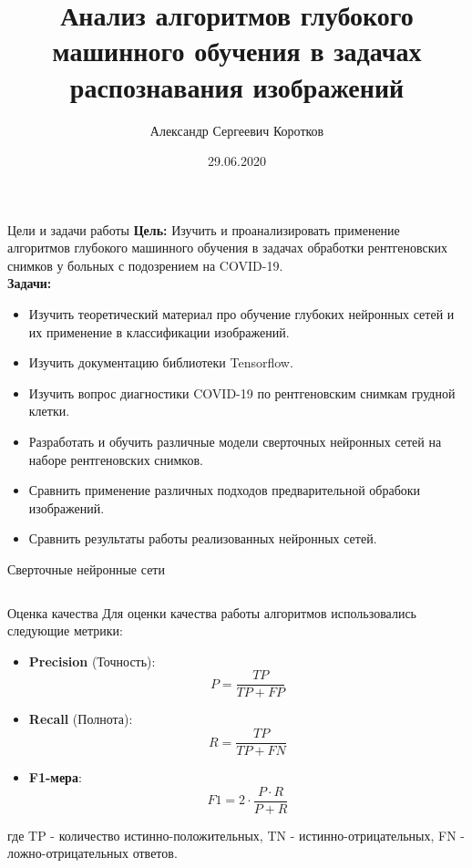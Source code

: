 \documentclass[aspectratio=169]{beamer}
\title{Анализ алгоритмов глубокого машинного обучения  в задачах распознавания изображений}
\author[Коротков А.С.]{Александр Сергеевич Коротков}
\institute[]{Научный руководитель: Д.В. Матвеев}
\date{29.06.2020}
\begin{document}
\maketitle
\begin{frame}{Цели и задачи работы}
    \textbf{Цель:} Изучить и проанализировать применение алгоритмов глубокого машинного обучения  в задачах обработки рентгеновских снимков у больных с подозрением на COVID-19. \\
    \textbf{Задачи: }
    \begin{itemize}
        \item Изучить теоретический материал про обучение глубоких нейронных сетей и их применение в классификации изображений.
        \item Изучить документацию библиотеки Tensorflow.
        \item Изучить вопрос диагностики COVID-19 по рентгеновским снимкам грудной клетки.
        \item Разработать и обучить различные модели сверточных нейронных сетей на наборе рентгеновских снимков.
        \item Сравнить применение различных подходов предварительной обрабоки изображений.
        \item Сравнить результаты работы реализованных нейронных сетей.
    \end{itemize}
\end{frame}

\begin{frame}{Сверточные нейронные сети}
    \begin{columns}[T]
        \begin{column}{.4\paperwidth}
            \centering
                
        \end{column}
        \begin{column}{.5\paperwidth}
            
        \end{column}
    \end{columns}   
\end{frame}

\begin{frame}{Оценка качества}
    Для оценки качества работы алгоритмов использовались следующие метрики:
    \begin{itemize}
        \item \textbf{Precision} (Точность): \[P = \frac{TP}{TP+FP}\]
        \item \textbf{Recall} (Полнота): \[R=\frac{TP}{TP+FN}\] 
        \item \textbf{F1-мера}: \[F1=2 \cdot \frac{P \cdot R}{P+R}\] 
    \end{itemize}    
    где TP - количество истинно-положительных, TN - истинно-отрицательных, 
    FN - ложно-отрицательных ответов.
\end{frame}
\end{document}
